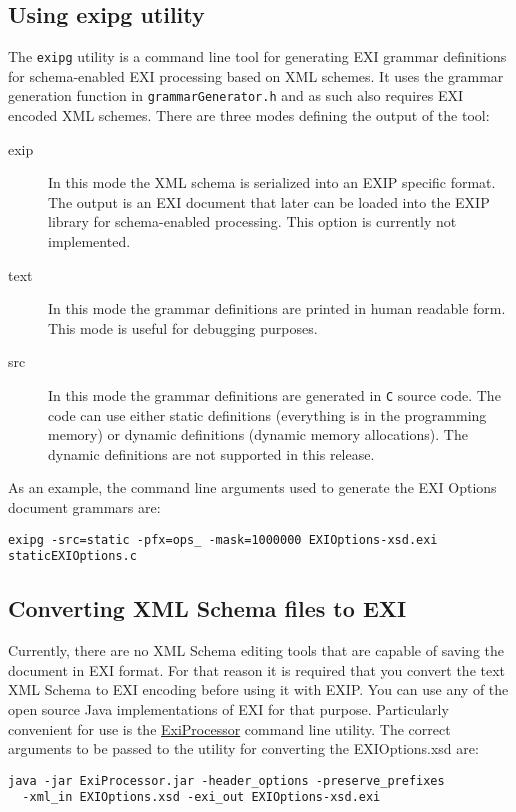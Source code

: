 \subsection{Using exipg utility}
The \texttt{exipg} utility is a command line tool for generating EXI grammar definitions
for schema-enabled EXI processing based on XML schemes.
It uses the grammar generation
function in \texttt{grammarGenerator.h} and as such also requires EXI encoded XML schemes.
There are three modes defining the output of the tool:
\begin{description}
 \item[exip] In this mode the XML schema is serialized into an EXIP specific format. The output is
	    an EXI document that later can be loaded into the EXIP library for schema-enabled processing.
	    This option is currently not implemented.
 \item[text] In this mode the grammar definitions are printed in human readable form. This mode is
	    useful for debugging purposes.
 \item[src] In this mode the grammar definitions are generated in \texttt{C} source code. The code
	    can use either static definitions (everything is in the programming memory) or
	    dynamic definitions (dynamic memory allocations). The dynamic definitions are
	    not supported in this release.
 \end{description}
As an example, the command line arguments used to generate the EXI Options document grammars are:
\begin{lstlisting}
exipg -src=static -pfx=ops_ -mask=1000000 EXIOptions-xsd.exi staticEXIOptions.c
\end{lstlisting}

\subsection{Converting XML Schema files to EXI}
Currently, there are no XML Schema editing tools that are capable of saving the document in EXI format.
For that reason it is required that you convert the text XML Schema to EXI encoding before using it
with EXIP. You can use any of the open source Java implementations of EXI for that purpose. Particularly
convenient for use is the \href{http://sourceforge.net/projects/exiprocessor/files/}{ExiProcessor} command line utility.
The correct arguments to be passed to the utility for converting the EXIOptions.xsd are:
\begin{lstlisting}
java -jar ExiProcessor.jar -header_options -preserve_prefixes
  -xml_in EXIOptions.xsd -exi_out EXIOptions-xsd.exi
\end{lstlisting}